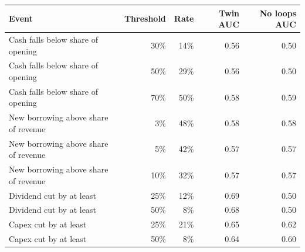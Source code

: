 \begin{tabular}{lrrrr}
\toprule
Event & Threshold & Rate & Twin AUC & No loops AUC \\
\midrule
Cash falls below share of opening & 30\% & 14\% & 0.56 & 0.50 \\
Cash falls below share of opening & 50\% & 29\% & 0.56 & 0.50 \\
Cash falls below share of opening & 70\% & 50\% & 0.58 & 0.59 \\
New borrowing above share of revenue & 3\% & 48\% & 0.58 & 0.58 \\
New borrowing above share of revenue & 5\% & 42\% & 0.57 & 0.57 \\
New borrowing above share of revenue & 10\% & 32\% & 0.57 & 0.57 \\
Dividend cut by at least & 25\% & 12\% & 0.69 & 0.50 \\
Dividend cut by at least & 50\% & 8\% & 0.68 & 0.50 \\
Capex cut by at least & 25\% & 21\% & 0.65 & 0.62 \\
Capex cut by at least & 50\% & 8\% & 0.64 & 0.60 \\
\bottomrule
\end{tabular}
